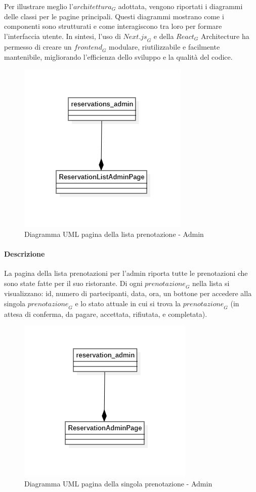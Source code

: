 Per illustrare meglio l'$\textit{architettura}_G$ adottata, vengono riportati i diagrammi delle classi per le pagine principali. Questi diagrammi mostrano come i componenti sono strutturati e come interagiscono tra loro per formare l'interfaccia utente.
In sintesi, l'uso di $\textit{Next.js}_G$ e della $\textit{React}_G$ Architecture ha permesso di creare un $\textit{frontend}_G$ modulare, riutilizzabile e facilmente mantenibile, migliorando l'efficienza dello sviluppo e la qualità del codice.
\begin{figure}[H]
    \centering
    \includegraphics[width=0.4\linewidth]{images/reservationS_admin_page.png}
    \caption{Diagramma UML pagina della lista prenotazione - Admin}
    \label{fig:restaurant_page}
\end{figure}
\paragraph{Descrizione} La pagina della lista prenotazioni per l'admin riporta tutte le prenotazioni che sono state fatte per il suo ristorante. Di ogni $\textit{prenotazione}_G$ nella lista si visualizzano: id, numero di partecipanti, data, ora, un bottone per accedere alla singola $\textit{prenotazione}_G$ e lo stato attuale in cui si trova la $\textit{prenotazione}_G$ (in attesa di conferma, da pagare, accettata, rifiutata, e completata).


\begin{figure}[H]
    \centering
    \includegraphics[width=0.4\linewidth]{images/reservation_admin_page.png}
    \caption{Diagramma UML pagina della singola prenotazione - Admin}
    \label{fig:restaurant_page}
\end{figure}
